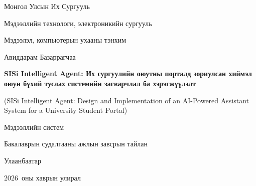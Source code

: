 \documentclass[12pt,a4paper]{report}
\newcommand{\UniversityName}{Монгол Улсын Их Сургууль}
\newcommand{\SchoolName}{Мэдээллийн технологи, электроникийн сургууль}
\newcommand{\DepartmentName}{Мэдээлэл, компьютерын ухааны тэнхим}
\newcommand{\ProgramName}{Мэдээллийн систем}
\newcommand{\StudentName}{Авиддарам Базаррагчаа}
\newcommand{\ReportTitle}{SISi Intelligent Agent: Их сургуулийн оюутны порталд зориулсан хиймэл оюун бүхий туслах системийн загварчлал ба хэрэгжүүлэлт}
\newcommand{\ReportTitleEn}{SISi Intelligent Agent: Design and Implementation of an AI-Powered Assistant System for a University Student Portal}
\newcommand{\ReportCity}{Улаанбаатар}
\newcommand{\ReportYear}{2026}
\begin{document}

\begin{titlepage}
  \begin{center}
    {\large \UniversityName \par}
    \vspace{0.2cm}
    {\large \SchoolName \par}
    \vspace{0.2cm}
    {\large \DepartmentName \par}

    \vfill

    {\Large \StudentName \par}
    \vspace{1cm}

    {\bfseries\LARGE \ReportTitle \par}
    \vspace{0.6cm}
    {\large (\ReportTitleEn) \par}
    \vspace{0.8cm}

    {\large \ProgramName \par}
    \vspace{0.3cm}
    {\large Бакалаврын судалгааны ажлын завсрын тайлан \par}

    \vfill

    {\large \ReportCity \par}
    {\large \ReportYear\ оны хаврын улирал \par}
  \end{center}
\end{titlepage}
\end{document}

